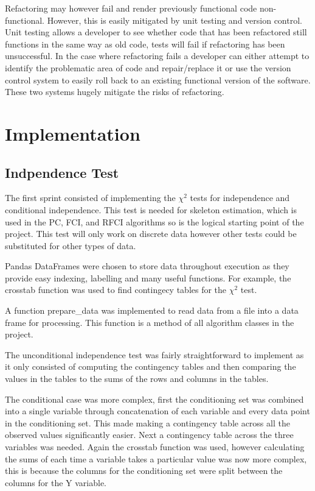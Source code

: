 \documentclass{UoYCSproject}
\begin{document}
Refactoring may however fail and render previously functional code non-functional. However, this is easily mitigated by unit testing and version control. Unit testing allows a developer to see whether code that has been refactored still functions in the same way as old code, tests will fail if refactoring has been unsuccessful. In the case where refactoring fails a developer can either attempt to identify the problematic area of code and repair/replace it or use the version control system to easily roll back to an existing functional version of the software. These two systems hugely mitigate the risks of refactoring.

\chapter{Implementation}

\section{Indpendence Test}
The first sprint consisted of implementing the  $\chi^2$ tests for independence and conditional independence. This test is needed for skeleton estimation, which is used in the PC, FCI, and RFCI algorithms so is the logical starting point of the project. This test will only work on discrete data however other tests could be substituted for other types of data.

Pandas DataFrames were chosen to store data throughout execution as they provide easy indexing, labelling and many useful functions. For example, the crosstab function was used to find contingecy tables for the $\chi^2$ test.

A function prepare\_data was implemented to read data from a file into a data frame for processing. This function is a method of all algorithm classes in the project.

The unconditional independence test was fairly straightforward to implement as it only consisted of computing the contingency tables and then comparing the values in the tables to the sums of the rows and columns in the tables.

The conditional case was more complex, first the conditioning set was combined into a single variable through concatenation of each variable and every data point in the conditioning set. This made making a contingency table across all the observed values significantly easier. Next a contingency table across the three variables was needed. Again the crosstab function was used, however calculating the sums of each time a variable takes a particular value was now more complex, this is because the columns for the conditioning set were split between the columns for the Y variable.
\end{document}
